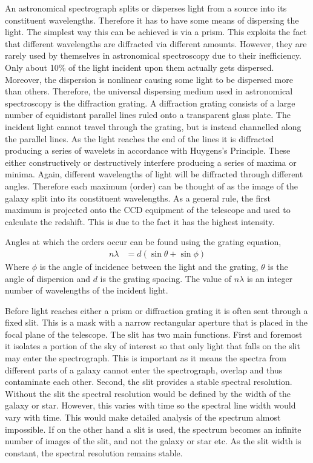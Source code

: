 	An astronomical spectrograph splits or disperses light from a source into its constituent wavelengths. Therefore it has to have some means of dispersing the light. The simplest way this can be achieved is via a prism. This exploits the fact that different wavelengths are diffracted via different amounts. However, they are rarely used by themselves in astronomical spectroscopy due to their inefficiency. Only about 10\% of the light incident upon them actually gets dispersed. Moreover, the dispersion is nonlinear causing some light to be dispersed more than others. Therefore, the universal dispersing medium used in astronomical spectroscopy is the diffraction grating. A diffraction grating consists of a large number of equidistant parallel lines ruled onto a transparent glass plate. The incident light cannot travel through the grating, but is instead channelled along the parallel lines. As the light reaches the end of the lines it is diffracted producing a series of wavelets in accordance with Huygens’s Principle. These either constructively or destructively interfere producing a series of maxima or minima. Again, different wavelengths of light will be diffracted through different angles. Therefore each maximum (order) can be thought of as the image of the galaxy split into its constituent wavelengths. As a general rule, the first maximum is projected onto the CCD equipment of the telescope and used to calculate the redshift. This is due to the fact it has the highest intensity.

	Angles at which the orders occur can be found using the grating equation,
	\begin{align}
		n\lambda &= d(\sin\theta + \sin\phi)
	\end{align}
	Where $\phi$ is the angle of incidence between the light and the grating, $\theta$ is the angle of dispersion and $d$ is the grating spacing. The value of $n\lambda$ is an integer number of wavelengths of the incident light.

	Before light reaches either a prism or diffraction grating it is often sent through a fixed slit. This is a mask with a narrow rectangular aperture that is placed in the focal plane of the telescope. The slit has two main functions. First and foremost it isolates a portion of the sky of interest so that only light that falls on the slit may enter the spectrograph. This is important as it means the spectra from different parts of a galaxy cannot enter the spectrograph, overlap and thus contaminate each other. Second, the slit provides a stable spectral resolution. Without the slit the spectral resolution would be defined by the width of the galaxy or star. However, this varies with time so the spectral line width would vary with time. This would make detailed analysis of the spectrum almost impossible. If on the other hand a slit is used, the spectrum becomes an infinite number of images of the slit, and not the galaxy or star etc. As the slit width is constant, the spectral resolution remains stable.


